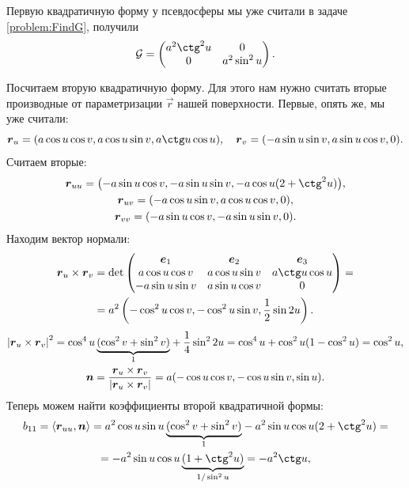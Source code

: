 \begin{solution}
	Первую квадратичную форму у псевдосферы мы уже считали в задаче \ref{problem:FindG}, получили
	\[
		\G =
		\begin{pmatrix}
			a^2\ctg^2u & 0\\
			0 & a^2\sin^2u
		\end{pmatrix}.
	\]

	Посчитаем вторую квадратичную форму. Для этого нам нужно считать вторые производные от параметризации $\vec{r}$ нашей поверхности. Первые, опять же, мы уже считали:
	\[
		\vec{r}_u = (a\cos u\cos v, a\cos u\sin v, a\ctg u\cos u),\quad\vec{r}_v = (-a\sin u\sin v, a\sin u\cos v, 0).
	\]
	Считаем вторые:
	\begin{gather*}
		\vec{r}_{uu} = \big({-a\sin u\cos v}, -a\sin u\sin v, -a\cos u(2 + \ctg^2u)\big),\\
		\vec{r}_{uv} = (-a\cos u\sin v, a\cos u\cos v, 0),\\
		\vec{r}_{vv} = (-a\sin u\cos v, -a\sin u\sin v, 0).
	\end{gather*}
	Находим вектор нормали:
	\begin{multline*}
		\vec{r}_u \times \vec{r}_v = \det
		\begin{pmatrix}
			\vec{e}_1 & \vec{e}_2 & \vec{e}_3\\
			a\cos u\cos v & a\cos u\sin v & a\ctg u\cos u\\
			-a\sin u\sin v & a\sin u\cos v & 0
		\end{pmatrix} =\\ = a^2 \br{{-\cos^2u\cos v}, -\cos^2u\sin v, \frac{1}{2}\sin 2u}.
	\end{multline*}
	\begin{gather*}
		\left\lvert\boldsymbol{r}_u \times \boldsymbol{r}_v\right\rvert^2 = {\cos^4u\underbrace{(\cos^2v + \sin^2v)}_{1}} + \frac{1}{4}\sin^22u = \cos^4u + \cos^2u(1 - \cos^2u) = \cos^2u,\\
		\boldsymbol{n} = \frac{\boldsymbol{r}_u \times \boldsymbol{r}_v}{\left\lvert\boldsymbol{r}_u \times \boldsymbol{r}_v\right\rvert} = a(-\cos u\cos v, -\cos u\sin v, \sin u).
	\end{gather*}
	Теперь можем найти коэффициенты второй квадратичной формы:
	\begin{multline*}
		b_{11} = \langle\vec{r}_{uu}, \vec{n}\rangle = {a^2\cos u\sin u\underbrace{(\cos^2 v + \sin ^2 v)}_{1}} - a^2\sin u\cos u(2 + \ctg^2u) =\\ = {-a^2\sin u\cos u\underbrace{(1 + \ctg^2 u)}_{1 / \sin^2u}} = -a^2\ctg u,
	\end{multline*}
	\begin{gather*}

\end{gather*}
\end{solution}
